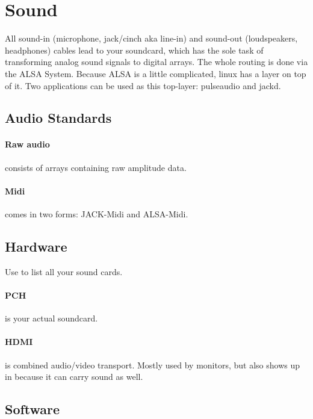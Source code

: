 \section{Sound}


All sound-in (microphone, jack/cinch aka line-in) and sound-out (loudspeakers, headphones) cables lead to your soundcard, which has the sole task of transforming analog sound signals to digital  arrays. The whole routing is done via the ALSA System. 
Because ALSA is a little complicated, linux has a layer on top of it. Two applications can be used as this top-layer: pulseaudio and jackd.  

\subsection{Audio Standards}

\paragraph{Raw audio} consists of  arrays containing raw amplitude data. 

\paragraph{Midi} comes in two forms: JACK-Midi and ALSA-Midi.

\subsection{Hardware}

Use  to list all your sound cards. 

\paragraph{PCH} is your actual soundcard. 

\paragraph{HDMI} is combined audio/video transport. Mostly used by monitors, but also shows up in  because it can carry sound as well. 

\subsection{Software}

